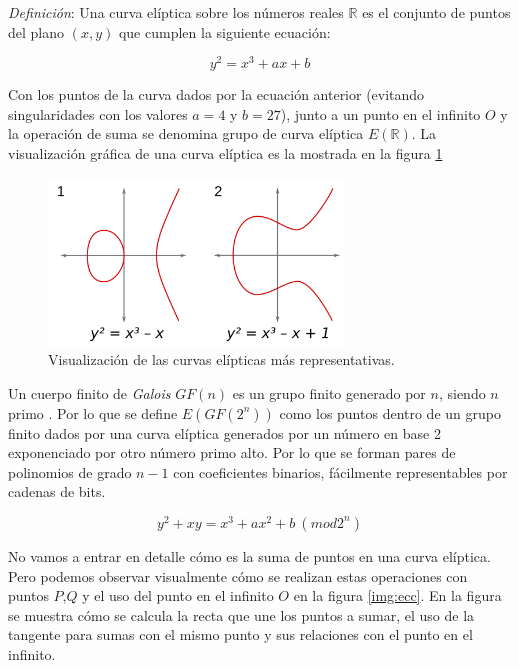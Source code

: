\documentclass[../PFC.tex]{subfiles}
\begin{document}
\textit{Definición}: Una curva elíptica sobre los números reales $\mathbb{R}$ es el conjunto de puntos del plano $(x , y)$ que cumplen la siguiente ecuación\cite{bruce}:

\begin{equation}
y^2 = x^3 + ax + b
\end{equation}

Con los puntos de la curva dados por la ecuación anterior (evitando singularidades con los valores $a = 4$ y $b = 27$), junto a un punto en el infinito $O$ y la operación de suma se denomina grupo de curva elíptica $E(\mathbb{R})$. La visualización gráfica de una curva elíptica es la mostrada en la figura \ref{img:ec}

\begin{figure}[H]
  \centering
  \includegraphics[width=0.7\textwidth]{./img/EC}
  \caption{Visualización de las curvas elípticas más representativas.}
  \label{img:ec}
\end{figure}

Un cuerpo finito de \textit{Galois} $GF(n)$ es un grupo finito generado por $n$, siendo $n$ primo \cite{lucena}. Por lo que se define $E(GF(2^n))$ como los puntos dentro de un grupo finito dados por una curva elíptica generados por un número en base 2 exponenciado por otro número primo alto. Por lo que se forman pares de polinomios de grado $n-1$ con coeficientes binarios, fácilmente representables por cadenas de bits\cite{lucena}.

\begin{equation}
y^2 + xy = x^3 + ax^2 + b\ (mod 2^n)
\end{equation}

No vamos a entrar en detalle cómo es la suma de puntos en una curva elíptica. Pero podemos observar visualmente cómo se realizan estas operaciones con puntos $P$,$Q$ y el uso del punto en el infinito $O$ en la figura \ref{img:ecc}. En la figura se muestra cómo se calcula la recta que une los puntos a sumar, el uso de la tangente para sumas con el mismo punto y sus relaciones con el punto en el infinito.
\end{document}
